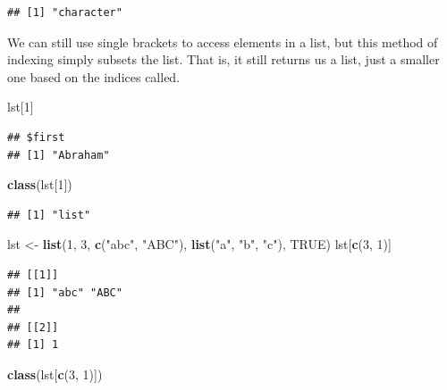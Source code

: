 \documentclass[
]{book}
\newenvironment{Shaded}{\begin{snugshade}}{\end{snugshade}}
\newcommand{\DecValTok}[1]{\textcolor[rgb]{0.00,0.00,0.81}{#1}}
\newcommand{\KeywordTok}[1]{\textcolor[rgb]{0.13,0.29,0.53}{\textbf{#1}}}
\newcommand{\NormalTok}[1]{#1}
\newcommand{\OtherTok}[1]{\textcolor[rgb]{0.56,0.35,0.01}{#1}}
\newcommand{\StringTok}[1]{\textcolor[rgb]{0.31,0.60,0.02}{#1}}
\begin{document}
\begin{verbatim}
## [1] "character"
\end{verbatim}

We can still use single brackets to access elements in a list, but this method of indexing simply subsets the list. That is, it still returns us a list, just a smaller one based on the indices called.

\begin{Shaded}
\begin{Highlighting}[]
\NormalTok{lst[}\DecValTok{1}\NormalTok{]}
\end{Highlighting}
\end{Shaded}

\begin{verbatim}
## $first
## [1] "Abraham"
\end{verbatim}

\begin{Shaded}
\begin{Highlighting}[]
\KeywordTok{class}\NormalTok{(lst[}\DecValTok{1}\NormalTok{])}
\end{Highlighting}
\end{Shaded}

\begin{verbatim}
## [1] "list"
\end{verbatim}

\begin{Shaded}
\begin{Highlighting}[]
\NormalTok{lst <-}\StringTok{ }\KeywordTok{list}\NormalTok{(}\DecValTok{1}\NormalTok{, }\DecValTok{3}\NormalTok{, }\KeywordTok{c}\NormalTok{(}\StringTok{"abc"}\NormalTok{,}
    \StringTok{"ABC"}\NormalTok{), }\KeywordTok{list}\NormalTok{(}\StringTok{"a"}\NormalTok{,}
    \StringTok{"b"}\NormalTok{, }\StringTok{"c"}\NormalTok{), }\OtherTok{TRUE}\NormalTok{)}
\NormalTok{lst[}\KeywordTok{c}\NormalTok{(}\DecValTok{3}\NormalTok{, }\DecValTok{1}\NormalTok{)]}
\end{Highlighting}
\end{Shaded}

\begin{verbatim}
## [[1]]
## [1] "abc" "ABC"
## 
## [[2]]
## [1] 1
\end{verbatim}

\begin{Shaded}
\begin{Highlighting}[]
\KeywordTok{class}\NormalTok{(lst[}\KeywordTok{c}\NormalTok{(}\DecValTok{3}\NormalTok{, }\DecValTok{1}\NormalTok{)])}
\end{Highlighting}
\end{Shaded}
\end{document}

